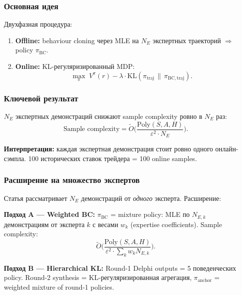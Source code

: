 \documentclass[a4paper, 11pt]{article}
\begin{document}
\subsubsection{Основная идея}

Двухфазная процедура:
\begin{enumerate}[nosep]
  \item \textbf{Offline:} behaviour cloning через MLE на $N_E$ экспертных траекторий
    $\Rightarrow$ policy $\pi_{\mathrm{BC}}$.
  \item \textbf{Online:} KL-регуляризированный MDP:
    \[
    \max_{\pi}\; V^{\pi}(r) - \lambda \cdot \mathrm{KL}(\pi_{\mathrm{traj}} \,\|\, \pi_{\mathrm{BC},\mathrm{traj}}).
    \]
\end{enumerate}

\subsubsection{Ключевой результат}

$N_E$ экспертных демонстраций снижают sample complexity ровно в $N_E$ раз:
\begin{equation}
\label{eq:demo_reg}
\text{Sample complexity} = \widetilde{O}\!\biggl(\frac{\mathrm{Poly}(S, A, H)}{\varepsilon^2 \cdot N_E}\biggr).
\end{equation}

\textbf{Интерпретация:} каждая экспертная демонстрация стоит ровно
одного онлайн-сэмпла. 100 исторических ставок трейдера = 100 online samples.

\subsubsection{Расширение на множество экспертов}

Статья рассматривает $N_E$ демонстраций от \emph{одного} эксперта.
Расширение:

\textbf{Подход A --- Weighted BC:}
$\pi_{\mathrm{BC}}$ = mixture policy: MLE по $N_{E,k}$ демонстрациям от эксперта $k$
с весами $w_k$ (expertise coefficients).
Sample complexity:
\[
\widetilde{O}\!\biggl(\frac{\mathrm{Poly}(S,A,H)}{\varepsilon^2 \cdot \sum_k w_k N_{E,k}}\biggr).
\]

\textbf{Подход B --- Hierarchical KL:}
Round-1 Delphi outputs = 5 поведенческих policy.
Round-2 synthesis = KL-регуляризированная агрегация,
$\pi_{\mathrm{anchor}}$ = weighted mixture of round-1 policies.

\end{document}
